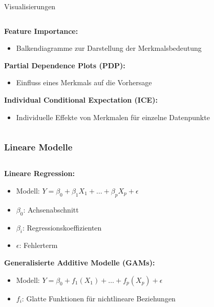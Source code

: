 \documentclass[aspectratio=1610, xcolor=dvipsnames, 9pt]{beamer}
\begin{document}
\begin{frame}{Visualisierungen}
  \begin{columns}
    \begin{column}{1\textwidth}
      \textbf{Feature Importance:}
      \begin{itemize}
        \item Balkendiagramme zur Darstellung der Merkmalsbedeutung
      \end{itemize}
      \vspace{0.3cm}
      \textbf{Partial Dependence Plots (PDP):}
      \begin{itemize}
        \item Einfluss eines Merkmals auf die Vorhersage
      \end{itemize}
      \vspace{0.3cm}
      \textbf{Individual Conditional Expectation (ICE):}
      \begin{itemize}
        \item Individuelle Effekte von Merkmalen für einzelne Datenpunkte
      \end{itemize}
    \end{column}
  \end{columns}
\end{frame}

\begin{frame}
  \frametitle{Lineare Modelle}
  \begin{columns}
    \begin{column}{1\textwidth}
      \textbf{Lineare Regression:}
      \begin{itemize}
        \item Modell: $Y = \beta_0 + \beta_1 X_1 + \dots + \beta_p X_p + \epsilon$
        \item $\beta_0$: Achsenabschnitt
        \item $\beta_i$: Regressionskoeffizienten
        \item $\epsilon$: Fehlerterm
      \end{itemize}
      \vspace{0.5cm}
      \textbf{Generalisierte Additive Modelle (GAMs):}
      \begin{itemize}
        \item Modell: $Y = \beta_0 + f_1(X_1) + \dots + f_p(X_p) + \epsilon$
        \item $f_i$: Glatte Funktionen für nichtlineare Beziehungen
      \end{itemize}
    \end{column}
  \end{columns}
\end{frame}
\end{document}
